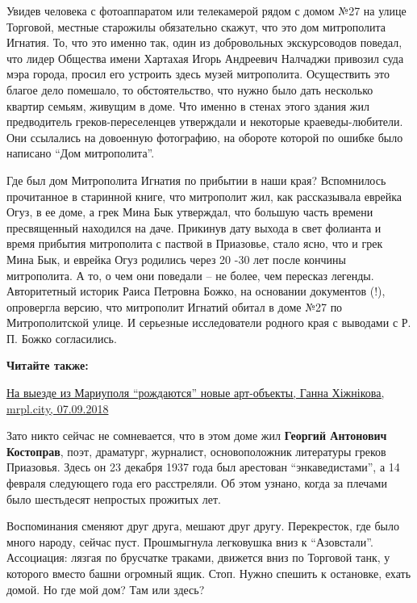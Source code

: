 
Увидев человека с фотоаппаратом или телекамерой рядом с домом №27 на улице
Торговой, местные старожилы обязательно скажут, что это дом митрополита
Игнатия. То, что это именно так, один из добровольных экскурсоводов поведал,
что лидер Общества имени Хартахая Игорь Андреевич Налчаджи привозил суда мэра
города, просил его устроить здесь музей митрополита. Осуществить это благое
дело помешало, то обстоятельство, что нужно было дать несколько квартир семьям,
живущим в доме. Что именно в стенах этого здания жил предводитель
греков-переселенцев утверждали и некоторые краеведы-любители. Они ссылались на
довоенную фотографию, на обороте которой по ошибке было написано \enquote{Дом
митрополита}.

Где был дом Митрополита Игнатия по прибытии в наши края? Вспомнилось
прочитанное в старинной книге, что митрополит жил, как рассказывала еврейка
Огуз, в ее доме, а грек Мина Бык утверждал, что большую часть времени
пресвященный находился на даче. Прикинув дату выхода в свет фолианта и время
прибытия митрополита с паствой в Приазовье, стало ясно, что и грек Мина Бык, и
еврейка Огуз родились через 20 -30 лет после кончины митрополита. А то, о чем
они поведали – не более, чем пересказ легенды. Авторитетный историк Раиса
Петровна Божко, на основании документов (!), опровергла версию, что митрополит
Игнатий обитал в доме №27 по Митрополитской улице. И серьезные исследователи
родного края с выводами с Р. П. Божко согласились.

\textbf{Читайте также:} 

\href{https://mrpl.city/news/view/na-vyezde-iz-mariupolya-rozhdayutsya-novye-art-obekty-foto}{%
На выезде из Мариуполя \enquote{рождаются} новые арт-объекты, Ганна Хіжнікова, mrpl.city, 07.09.2018}

Зато никто сейчас не сомневается, что в этом доме жил \textbf{Георгий Антонович
Костоправ}, поэт, драматург, журналист, основоположник литературы греков
Приазовья. Здесь он 23 декабря 1937 года был арестован \enquote{энкаведистами}, а 14
февраля следующего года его расстреляли. Об этом узнано, когда за плечами было
шестьдесят непростых прожитых лет.

Воспоминания сменяют друг друга, мешают друг другу. Перекресток, где было много
народу, сейчас пуст. Прошмыгнула легковушка вниз к \enquote{Азовстали}. Ассоциация:
лязгая по брусчатке траками, движется вниз по Торговой танк, у которого вместо
башни огромный ящик. Стоп. Нужно спешить к остановке, ехать домой. Но где мой
дом? Там или здесь?
